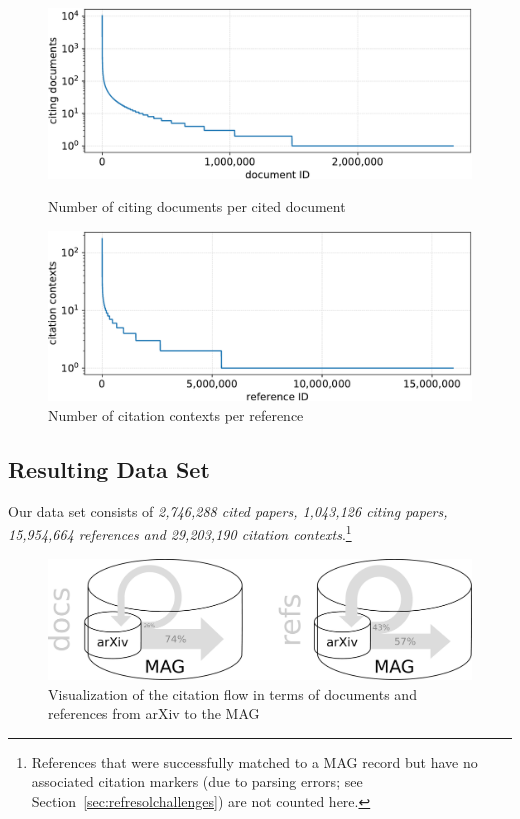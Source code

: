 \begin{figure}[!ht]
  \centering
  \includegraphics[width=0.92\linewidth]{figures/corpus/Fig2.pdf}
  \caption{Number of citing documents per cited document}
  \label{fig:numcitdoc}
  \vspace{1em}
  \includegraphics[width=0.92\linewidth]{figures/corpus/Fig3.pdf}
  \caption{Number of citation contexts per reference}
  \label{fig:numcontref}
    \vspace{1em}
\end{figure}

\subsection{Resulting Data Set}
Our data set consists of \emph{2,746,288 cited papers, 1,043,126 citing papers, 15,954,664 references and 29,203,190 citation contexts}.\footnote{References that were successfully matched to a MAG record but have no associated citation markers (due to parsing errors; see Section~\ref{sec:refresolchallenges}) are not counted here.} 

\begin{figure}[tb]
  \centering
    \includegraphics[width=.9\textwidth]{figures/corpus/Fig4.pdf}
  \caption{Visualization of the citation flow in terms of documents and references from arXiv to the MAG}
  \label{fig:inflow}
\end{figure}

